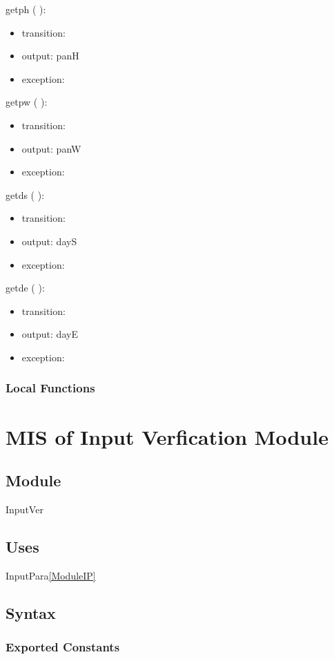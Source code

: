 \documentclass[12pt, titlepage]{article}
\begin{document}
\noindent  getph ( ):
\begin{itemize}
\item transition: 
\item output: panH
\item exception: 
\end{itemize}

\noindent  getpw ( ):
\begin{itemize}
\item transition: 
\item output: panW
\item exception: 
\end{itemize}

\noindent  getds ( ):
\begin{itemize}
\item transition: 
\item output: dayS
\item exception: 
\end{itemize}

\noindent  getde ( ):
\begin{itemize}
\item transition: 
\item output: dayE
\item exception: 
\end{itemize}

\subsubsection{Local Functions}

\section{MIS of Input Verfication Module} \label{ModuleIV} 

\subsection{Module}
InputVer

\subsection{Uses}
InputPara\ref{ModuleIP}

\subsection{Syntax}

\subsubsection{Exported Constants}
\end{document}
